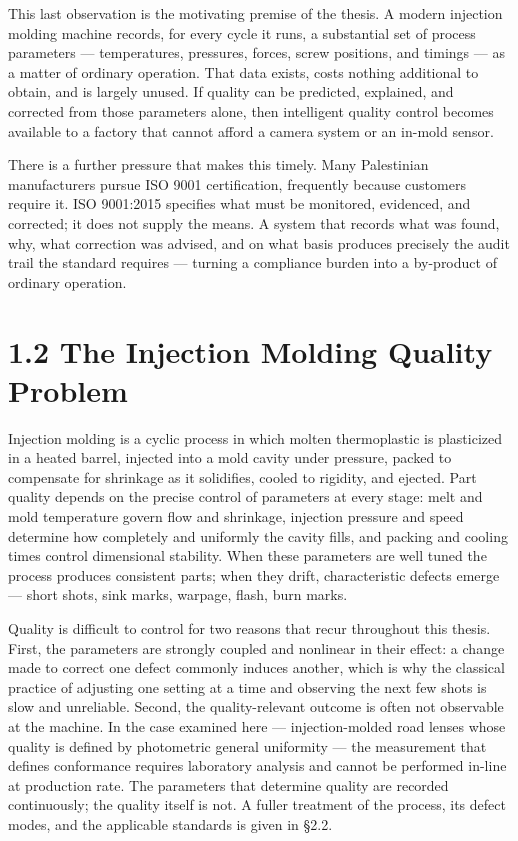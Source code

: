 This last observation is the motivating premise of the thesis. A modern injection molding machine records, for every cycle it runs, a substantial set of process parameters --- temperatures, pressures, forces, screw positions, and timings --- as a matter of ordinary operation. That data exists, costs nothing additional to obtain, and is largely unused. If quality can be predicted, explained, and corrected from those parameters alone, then intelligent quality control becomes available to a factory that cannot afford a camera system or an in-mold sensor.

There is a further pressure that makes this timely. Many Palestinian manufacturers pursue ISO 9001 certification, frequently because customers require it. ISO 9001:2015 specifies what must be monitored, evidenced, and corrected; it does not supply the means. A system that records what was found, why, what correction was advised, and on what basis produces precisely the audit trail the standard requires --- turning a compliance burden into a by-product of ordinary operation.

\hypertarget{the-injection-molding-quality-problem}{%
\section{1.2 The Injection Molding Quality Problem}\label{the-injection-molding-quality-problem}}

Injection molding is a cyclic process in which molten thermoplastic is plasticized in a heated barrel, injected into a mold cavity under pressure, packed to compensate for shrinkage as it solidifies, cooled to rigidity, and ejected. Part quality depends on the precise control of parameters at every stage: melt and mold temperature govern flow and shrinkage, injection pressure and speed determine how completely and uniformly the cavity fills, and packing and cooling times control dimensional stability. When these parameters are well tuned the process produces consistent parts; when they drift, characteristic defects emerge --- short shots, sink marks, warpage, flash, burn marks.

Quality is difficult to control for two reasons that recur throughout this thesis. First, the parameters are strongly coupled and nonlinear in their effect: a change made to correct one defect commonly induces another, which is why the classical practice of adjusting one setting at a time and observing the next few shots is slow and unreliable. Second, the quality-relevant outcome is often not observable at the machine. In the case examined here --- injection-molded road lenses whose quality is defined by photometric general uniformity --- the measurement that defines conformance requires laboratory analysis and cannot be performed in-line at production rate. The parameters that determine quality are recorded continuously; the quality itself is not. A fuller treatment of the process, its defect modes, and the applicable standards is given in §2.2.

